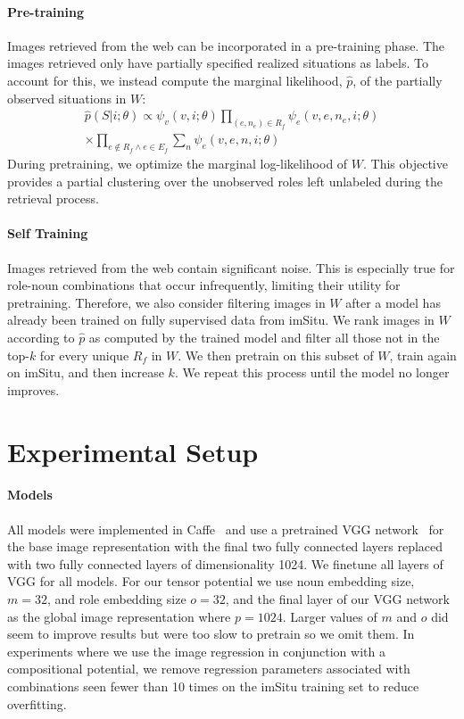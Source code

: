 \documentclass[10pt,twocolumn,letterpaper]{article}
\begin{document}
\paragraph{Pre-training}
Images retrieved from the web can be incorporated in a pre-training phase.
The images retrieved only have partially specified realized situations as labels. 
To account for this, we instead compute the marginal likelihood, $\hat{p}$, of the partially observed situations in $W$:
\begin{equation}
\begin{split}
\hat{p}(S |i; \theta) \propto \psi_v(v,i; \theta)\prod_{(e,n_e) \in R_f}\psi_e(v,e,n_e,i; \theta)\\
\times \prod_{e \notin R_f \wedge e \in E_f}\sum_{n}\psi_e(v,e,n,i; \theta)
\end{split}
\label{eqn:crf_pot}
\end{equation}
During pretraining, we optimize the marginal log-likelihood of $W$.
This objective provides a partial clustering over the unobserved roles left unlabeled during the retrieval process. 

\paragraph{Self Training}
Images retrieved from the web contain significant noise. 
This is especially true for role-noun combinations that occur infrequently, limiting their utility for pretraining. 
Therefore, we also consider filtering images in $W$ after a model has already been trained on fully supervised data from imSitu. 
We rank images in $W$ according to $\hat{p}$ as computed by the trained model and filter all those not in the top-$k$ for every unique $R_f$ in $W$.
We then pretrain on this subset of $W$, train again on imSitu, and then increase $k$. 
We repeat this process until the model no longer improves. \section{Experimental Setup}
\label{sec:setup}



\paragraph{Models}
All models were implemented in Caffe~\cite{caffe} and use a pretrained VGG network~\cite{vgg} for the base image representation with the final two fully connected layers replaced with two fully connected layers of dimensionality 1024. We finetune all layers of VGG for all models.
For our tensor potential we use noun embedding size, $m = 32$, and role embedding size $o = 32$, and the final layer of our VGG network as the global image representation where $p = 1024$. Larger values of $m$ and $o$ did seem to improve results but were too slow to pretrain so we omit them.
In experiments where we use the image regression in conjunction with a compositional potential, we remove regression parameters associated with combinations seen fewer than 10 times on the imSitu training set to reduce overfitting.
\end{document}

